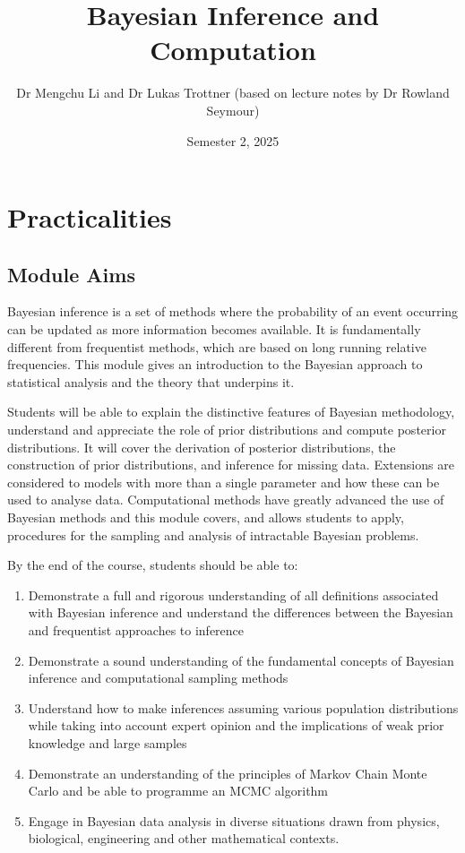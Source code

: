 \documentclass[
]{book}
\title{Bayesian Inference and Computation}
\author{Dr Mengchu Li and Dr Lukas Trottner (based on lecture notes by Dr Rowland Seymour)}
\date{Semester 2, 2025}
\providecommand{\tightlist}{%
  \setlength{\itemsep}{0pt}\setlength{\parskip}{0pt}}
\theoremstyle{definition}
\theoremstyle{definition}
\theoremstyle{definition}
\theoremstyle{definition}
\theoremstyle{remark}
\begin{document}
\maketitle

{
\setcounter{tocdepth}{1}
\tableofcontents
}
\chapter*{Practicalities}\label{practicalities}

\section{Module Aims}\label{module-aims}

Bayesian inference is a set of methods where the probability of an event
occurring can be updated as more information becomes available. It is
fundamentally different from frequentist methods, which are based on
long running relative frequencies. This module gives an introduction to
the Bayesian approach to statistical analysis and the theory that
underpins it.

Students will be able to explain the distinctive features of Bayesian
methodology, understand and appreciate the role of prior distributions
and compute posterior distributions. It will cover the derivation of
posterior distributions, the construction of prior distributions, and
inference for missing data. Extensions are considered to models with
more than a single parameter and how these can be used to analyse data.
Computational methods have greatly advanced the use of Bayesian methods
and this module covers, and allows students to apply, procedures for the
sampling and analysis of intractable Bayesian problems.

By the end of the course, students should be able to:

\begin{enumerate}
\def\labelenumi{\arabic{enumi}.}
\tightlist
\item
  Demonstrate a full and rigorous understanding of all definitions
  associated with Bayesian inference and understand the differences
  between the Bayesian and frequentist approaches to inference
\item
  Demonstrate a sound understanding of the fundamental concepts of
  Bayesian inference and computational sampling methods
\item
  Understand how to make inferences assuming various population
  distributions while taking into account expert opinion and the
  implications of weak prior knowledge and large samples
\item
  Demonstrate an understanding of the principles of Markov Chain Monte
  Carlo and be able to programme an MCMC algorithm
\item
  Engage in Bayesian data analysis in diverse situations drawn from
  physics, biological, engineering and other mathematical contexts.
\end{enumerate}
\end{document}
